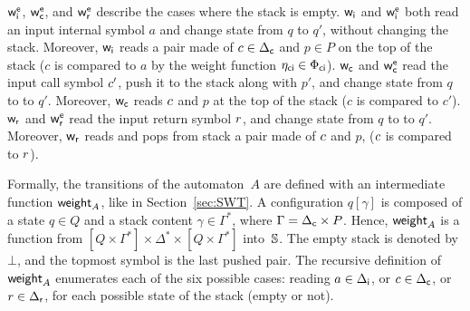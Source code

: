 \noindent
$\weiei$, $\weiec$, and $\weier$ describe the cases where the stack is empty.
%
\noindent
${\mathsf{w}_\mathsf{i}}$ and $\weiei$ both read an input internal symbol $a$ and change state from $q$ to $q'$,
without changing the stack.
Moreover, ${\mathsf{w}_\mathsf{i}}$ reads a pair made of
${c} \in {\Delta_\mathsf{c}}$ and $p \in P$ on the top of the stack
($c$ is compared to $a$ by the weight function $\eta_\mathsf{ci} \in {\Phi_\mathsf{ci}}$).
%
\noindent
${\mathsf{w}_\mathsf{c}}$ and $\weiec$ read the input call symbol $c'$,
push it to the stack along with $p'$, and change state from $q$ to to $q'$.
Moreover, ${\mathsf{w}_\mathsf{c}}$ reads ${c}$ and $p$ at the top of the stack
($c$ is compared to $c'$).
%
\noindent
${\mathsf{w}_\mathsf{r}}$ and $\weier$ read the input return symbol $r$, and change state from $q$ to to $q'$.
Moreover, ${\mathsf{w}_\mathsf{r}}$ reads and pops from stack a pair made of $c$ and $p$,
($c$ is compared to $r$).

Formally, the transitions of the automaton~$A$ are defined
with an intermediate function $\mathsf{weight}_A$, like in Section~\ref{sec:SWT}.
%
A configuration $q[\gamma]$
is composed of a state $q \in Q$
and a stack content $\gamma \in \Gamma^*$,
where $\Gamma = {\Delta_\mathsf{c}} \times P$.
Hence, $\mathsf{weight}_A$ is a function from
$[Q \times \Gamma^*] \times \Delta^* \times [Q \times \Gamma^*]$ into~$\mathbb{S}$.
The empty stack is denoted by $\bot$, and the topmost
symbol is the last pushed pair.
%
The recursive definition of $\mathsf{weight}_A$
enumerates each of the six possible cases:
reading $a \in {\Delta_\mathsf{i}}$,
or $c \in {\Delta_\mathsf{c}}$, or $r \in {\Delta_\mathsf{r}}$,
for each possible state of the stack (empty or not).

